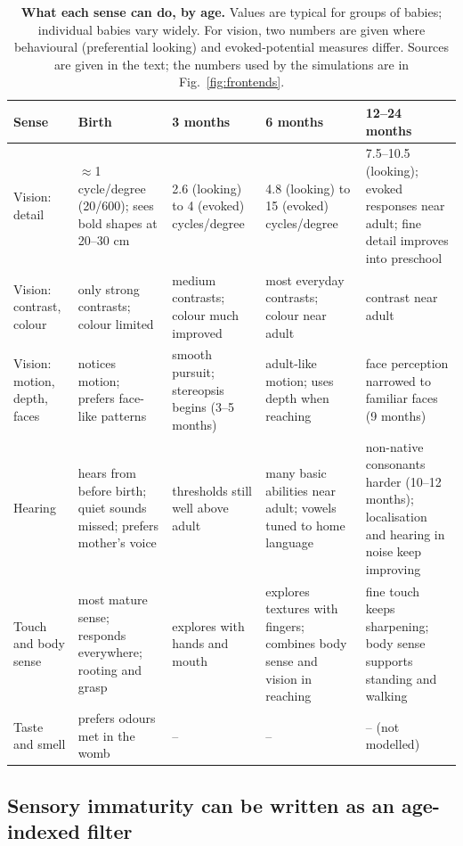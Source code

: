 \documentclass{article}
\begin{document}
\begin{table}[t]
\caption{\textbf{What each sense can do, by age.} Values are typical for groups of babies; individual babies vary widely. For vision, two numbers are given where behavioural (preferential looking) and evoked-potential measures differ. Sources are given in the text; the numbers used by the simulations are in Fig.~\ref{fig:frontends}.}
\label{tab:senses}
\centering
\footnotesize
\begin{tabularx}{\textwidth}{@{}p{1.55cm}LLLL@{}}
\toprule
Sense & Birth & 3 months & 6 months & 12--24 months \\
\midrule
Vision: detail & $\approx$1 cycle/degree (20/600); sees bold shapes at 20--30 cm & 2.6 (looking) to 4 (evoked) cycles/degree & 4.8 (looking) to 15 (evoked) cycles/degree & 7.5--10.5 (looking); evoked responses near adult; fine detail improves into preschool \\
Vision: contrast, colour & only strong contrasts; colour limited & medium contrasts; colour much improved & most everyday contrasts; colour near adult & contrast near adult \\
Vision: motion, depth, faces & notices motion; prefers face-like patterns & smooth pursuit; stereopsis begins (3--5 months) & adult-like motion; uses depth when reaching & face perception narrowed to familiar faces (9 months) \\
Hearing & hears from before birth; quiet sounds missed; prefers mother's voice & thresholds still well above adult & many basic abilities near adult; vowels tuned to home language & non-native consonants harder (10--12 months); localisation and hearing in noise keep improving \\
Touch and body sense & most mature sense; responds everywhere; rooting and grasp & explores with hands and mouth & explores textures with fingers; combines body sense and vision in reaching & fine touch keeps sharpening; body sense supports standing and walking \\
Taste and smell & prefers odours met in the womb & -- & -- & -- (not modelled) \\
\bottomrule
\end{tabularx}
\end{table}

\subsection{Sensory immaturity can be written as an age-indexed filter}
\end{document}
